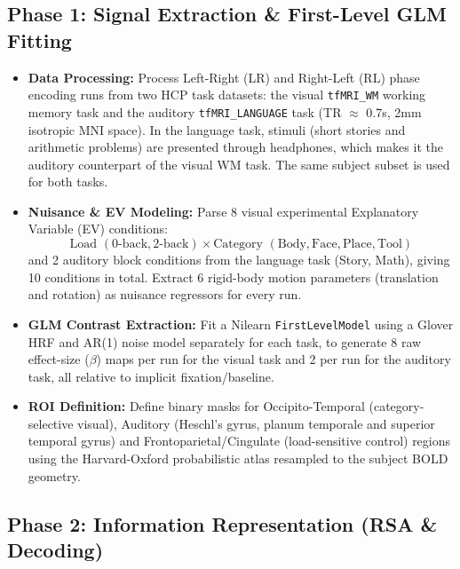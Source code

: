 \documentclass[11pt,a4paper]{article}
\begin{document}
\subsection{Phase 1: Signal Extraction \& First-Level GLM Fitting}

\begin{itemize}
    \item \textbf{Data Processing:} Process Left-Right (LR) and Right-Left (RL) phase encoding runs from two HCP task datasets: the visual \texttt{tfMRI\_WM} working memory task and the auditory \texttt{tfMRI\_LANGUAGE} task (TR $\approx$ 0.7s, 2mm isotropic MNI space). In the language task, stimuli (short stories and arithmetic problems) are presented through headphones, which makes it the auditory counterpart of the visual WM task. The same subject subset is used for both tasks.
    \item \textbf{Nuisance \& EV Modeling:} Parse 8 visual experimental Explanatory Variable (EV) conditions:
    \[
    \text{Load } (0\text{-back}, 2\text{-back}) \times \text{Category } (\text{Body}, \text{Face}, \text{Place}, \text{Tool})
    \]
    and 2 auditory block conditions from the language task (Story, Math), giving 10 conditions in total. Extract 6 rigid-body motion parameters (translation and rotation) as nuisance regressors for every run.
    \item \textbf{GLM Contrast Extraction:} Fit a Nilearn \texttt{FirstLevelModel} using a Glover HRF and AR(1) noise model separately for each task, to generate 8 raw effect-size ($\beta$) maps per run for the visual task and 2 per run for the auditory task, all relative to implicit fixation/baseline.
    \item \textbf{ROI Definition:} Define binary masks for Occipito-Temporal (category-selective visual), Auditory (Heschl's gyrus, planum temporale and superior temporal gyrus) and Frontoparietal/Cingulate (load-sensitive control) regions using the Harvard-Oxford probabilistic atlas resampled to the subject BOLD geometry.
\end{itemize}

\subsection{Phase 2: Information Representation (RSA \& Decoding)}
\end{document}
